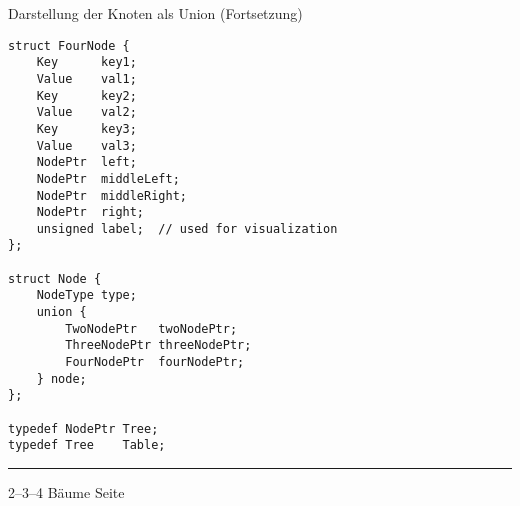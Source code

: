 
\begin{slide}{}
\normalsize

\begin{center}
Darstellung der Knoten als Union (Fortsetzung)
\end{center}
\vspace*{0.5cm}

\footnotesize
\begin{verbatim}
struct FourNode {
    Key      key1;
    Value    val1;
    Key      key2;
    Value    val2;
    Key      key3;
    Value    val3;
    NodePtr  left;
    NodePtr  middleLeft;
    NodePtr  middleRight;
    NodePtr  right;
    unsigned label;  // used for visualization
};

struct Node {
    NodeType type;
    union {
        TwoNodePtr   twoNodePtr;
        ThreeNodePtr threeNodePtr;
        FourNodePtr  fourNodePtr;
    } node;
};

typedef NodePtr Tree;
typedef Tree    Table;
\end{verbatim}

\vspace*{\fill}
\tiny \addtocounter{mypage}{1}
\rule{17cm}{1mm}
2--3--4 B\"aume  \hspace*{\fill} Seite 
\end{slide}


